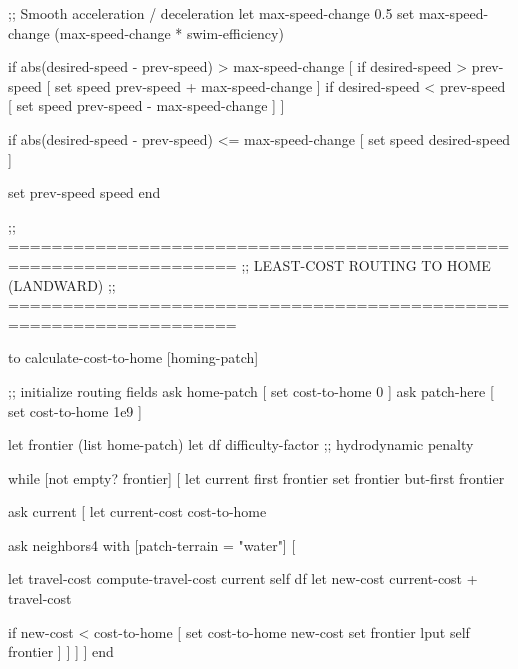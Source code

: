\documentclass[
]{book}
\newenvironment{Shaded}{\begin{snugshade}}{\end{snugshade}}
\newcommand{\NormalTok}[1]{#1}
\begin{document}
\begin{Shaded}
\begin{Highlighting}[]
\NormalTok{  ;; Smooth acceleration / deceleration}
\NormalTok{  let max{-}speed{-}change 0.5}
\NormalTok{  set max{-}speed{-}change (max{-}speed{-}change * swim{-}efficiency)}

\NormalTok{  if abs(desired{-}speed {-} prev{-}speed) \textgreater{} max{-}speed{-}change [}
\NormalTok{    if desired{-}speed \textgreater{} prev{-}speed [}
\NormalTok{      set speed prev{-}speed + max{-}speed{-}change}
\NormalTok{    ]}
\NormalTok{    if desired{-}speed \textless{} prev{-}speed [}
\NormalTok{      set speed prev{-}speed {-} max{-}speed{-}change}
\NormalTok{    ]}
\NormalTok{  ]}

\NormalTok{  if abs(desired{-}speed {-} prev{-}speed) \textless{}= max{-}speed{-}change [}
\NormalTok{    set speed desired{-}speed}
\NormalTok{  ]}

\NormalTok{  set prev{-}speed speed}
\NormalTok{end}


\NormalTok{;; ===================================================================}
\NormalTok{;;  LEAST{-}COST ROUTING TO HOME (LANDWARD)}
\NormalTok{;; ===================================================================}

\NormalTok{to calculate{-}cost{-}to{-}home [homing{-}patch]}

\NormalTok{  ;; initialize routing fields}
\NormalTok{  ask home{-}patch  [ set cost{-}to{-}home 0 ]}
\NormalTok{  ask patch{-}here  [ set cost{-}to{-}home 1e9 ]}

\NormalTok{  let frontier (list home{-}patch)}
\NormalTok{  let df difficulty{-}factor                 ;; hydrodynamic penalty}

\NormalTok{  while [not empty? frontier] [}
\NormalTok{    let current first frontier}
\NormalTok{    set frontier but{-}first frontier}

\NormalTok{    ask current [}
\NormalTok{      let current{-}cost cost{-}to{-}home}
      
\NormalTok{      ask neighbors4 with [patch{-}terrain = "water"] [}
        
\NormalTok{        let travel{-}cost compute{-}travel{-}cost current self df}
\NormalTok{        let new{-}cost current{-}cost + travel{-}cost}

\NormalTok{        if new{-}cost \textless{} cost{-}to{-}home [}
\NormalTok{          set cost{-}to{-}home new{-}cost}
\NormalTok{          set frontier lput self frontier}
\NormalTok{        ]}
\NormalTok{      ]}
\NormalTok{    ]}
\NormalTok{  ]}
\NormalTok{end}



\end{Highlighting}
\end{Shaded}
\end{document}
